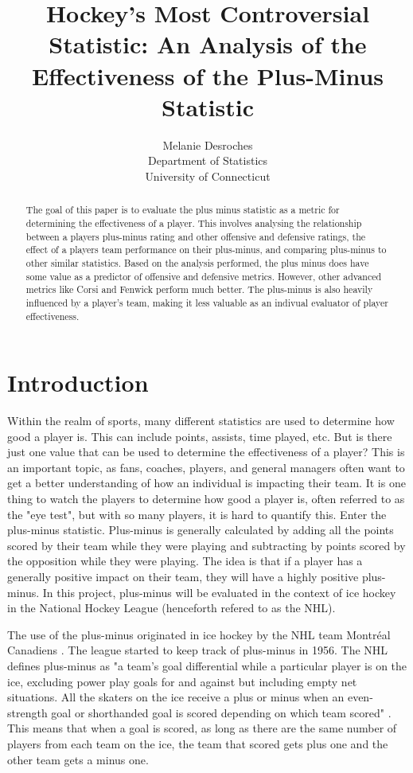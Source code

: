 \documentclass[12pt]{article}
\title{Hockey's Most Controversial Statistic: An Analysis of the Effectiveness of the Plus-Minus Statistic}
\author{Melanie Desroches\\
  Department of Statistics\\
  University of Connecticut
}
\begin{document}
\maketitle

\begin{abstract}

The goal of this paper is to evaluate the plus minus statistic as a metric for determining the effectiveness of a player.
This involves analysing the relationship between a players plus-minus rating and other offensive and defensive ratings,
the effect of a players team performance on their plus-minus, and comparing plus-minus to other similar statistics. Based
on the analysis performed, the plus minus does have some value as a predictor of offensive and defensive metrics. However, other
advanced metrics like Corsi and Fenwick perform much better. The plus-minus is also heavily influenced by a player's team, making it 
less valuable as an indivual evaluator of player effectiveness.

\end{abstract}

\doublespacing

\section{Introduction}
\label{sec:intro}


Within the realm of sports, many different statistics are used to determine how good a player is. This can include points,
assists, time played, etc. But is there just one value that can be used to determine the effectiveness of a player? This is an 
important topic, as fans, coaches, players, and general managers often want to get a better understanding of how an individual is
impacting their team. It is one thing to watch the players to determine how good a player is, often referred to as the "eye test", but 
with so many players, it is hard to quantify this. Enter the plus-minus statistic. Plus-minus is generally calculated by adding all the points
scored by their team while they were playing and subtracting by points scored by the opposition while they were playing. The idea is that 
if a player has a generally positive impact on their team, they will have a highly positive plus-minus. In this project, plus-minus will
be evaluated in the context of ice hockey in the National Hockey League (henceforth refered to as the NHL).

The use of the plus-minus originated in ice hockey by the NHL team Montréal Canadiens \cite{plus_minus_rating}. The league
started to keep track of plus-minus in 1956. The NHL defines plus-minus as "a team's goal differential while a particular player 
is on the ice, excluding power play goals for and against but including empty net situations. All the skaters on the ice receive a plus 
or minus when an even-strength goal or shorthanded goal is scored depending on which team scored" \cite{nhl_website}. This means
that when a goal is scored, as long as there are the same number of players from each team on the ice, the team that scored gets plus one
and the other team gets a minus one.
\end{document}
